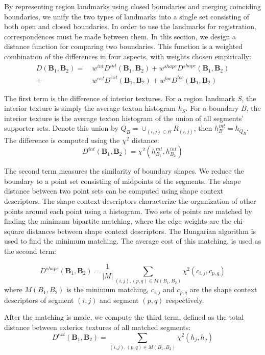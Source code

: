 \documentclass{llncs}
\begin{document}
By representing region landmarks using closed boundaries and merging coinciding boundaries, we unify the two types of landmarks into a single set consisting of both open and closed boundaries. In order to use the landmarks for registration, correspondences must be made between them. In this section, we design a distance function for comparing two boundaries. This function is a weighted combination of the differences in four aspects, with weights chosen empirically:
\begin{align*}
D(\mathbf{B}_1, \mathbf{B}_2) = & ~w^{int} D^{int}(\mathbf{B}_1, \mathbf{B}_2) + w^{shape} D^{shape}(\mathbf{B}_1, \mathbf{B}_2)  \\
+ & ~w^{ext} D^{ext}(\mathbf{B}_1, \mathbf{B}_2) 
+ w^{loc} D^{loc}(\mathbf{B}_1, \mathbf{B}_2) 
\end{align*}

The first term is the difference of interior textures. For a region landmark $S$, the interior texture is simply the average texton histogram $h_S$. For a boundary $B$, the interior texture is the average texton histogram of the union of all segments' supporter sets. Denote this union by $Q_B = \cup_{(i,j)\in B} R_{(i,j)}$, then $h^{int}_B = h_{Q_B}$. The difference is computed using the $\chi^2$ distance:
$$D^{int}(\mathbf{B}_1, \mathbf{B}_2) = \chi^2(h^{int}_{B_1}, h^{int}_{B_2})$$

The second term measures the similarity of boundary shapes. We reduce the boundary to a point set consisting of midpoints of the segments. The shape distance between two point sets can be computed using shape context descriptors\cite{belongie2000shape}. The shape context descriptors characterize the organization of other points around each point using a histogram. Two sets of points are matched by finding the minimum bipartite matching, where the edge weights are the chi-square distances between shape context descriptors. The Hungarian algorithm is used to find the minimum matching. The average cost of this matching, is used as the second term:

$$D^{shape}(\mathbf{B}_1, \mathbf{B}_2) = \frac{1}{|M|}\sum_{(i,j), (p,q) \in M(B_1,B_2)} \chi^2(c_{i,j}, c_{p,q})$$ where $M(B_1,B_2)$ is the minimum matching, $c_{i,j}$ and $c_{p,q}$ are the shape context descriptors of segment $(i,j)$ and segment $(p,q)$ respectively.

After the matching is made, we compute the third term, defined as the total distance between exterior textures of all matched segments:
$$D^{ext}(\mathbf{B}_1, \mathbf{B}_2) = \sum_{(i,j), (p,q) \in M(B_1,B_2)} \chi^2(h_j, h_q)$$
\end{document}
